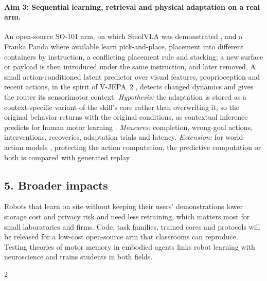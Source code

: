 \documentclass[11pt]{article}
\begin{document}
\paragraph{Aim 3: Sequential learning, retrieval and physical adaptation on a real arm.} An open-source SO-101 arm, on
which SmolVLA was demonstrated \citep{shukor2025smolvla}, and a Franka Panda where available learn pick-and-place,
placement into different containers by instruction, a conflicting placement rule and stacking; a new surface or payload
is then introduced under the same instruction, and later removed. A small action-conditioned latent predictor over
visual features, proprioception and recent actions, in the spirit of V-JEPA~2 \citep{assran2025vjepa2}, detects changed
dynamics and gives the router its sensorimotor context. \emph{Hypothesis:} the adaptation is stored as a context-specific
variant of the skill's core rather than overwriting it, so the original behavior returns with the original conditions,
as contextual inference predicts for human motor learning \citep{heald2021}. \emph{Measures:} completion, wrong-goal
actions, interventions, recoveries, adaptation trials and latency. \emph{Extension:} for world-action models
\citep{ye2026dreamzero}, protecting the action computation, the predictive computation or both is compared with
generated replay \citep{govind2026regen,fang2026r2wam,lin2026rifar}.

\subsection*{5. Broader impacts}
Robots that learn on site without keeping their users' demonstrations lower storage cost and privacy risk and need less
retraining, which matters most for small laboratories and firms. Code, task families, trained cores and protocols will
be released for a low-cost open-source arm that classrooms can reproduce. Testing theories of motor memory in embodied
agents links robot learning with neuroscience and trains students in both fields.

\begin{multicols}{2}


\end{multicols}
\end{document}
